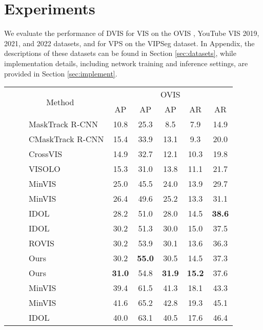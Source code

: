\documentclass[10pt,twocolumn,letterpaper]{article}
\begin{document}
\section{Experiments}
We evaluate the performance of DVIS for VIS on the OVIS \cite{ovis}, YouTube VIS 2019, 2021, and 2022 \cite{masktrackrcnn} datasets, and for VPS on the VIPSeg \cite{clippanofcn} dataset. In Appendix, the descriptions of these datasets can be found in Section \ref{sec:datasets}, while implementation details, including network training and inference settings, are provided in Section \ref{sec:implement}.
\begin{table}[t]
\centering
\setlength{\tabcolsep}{0.5mm}
\begin{tabular}{l|l|l|ccccc}
	\multirow{2}{*}{} & \multicolumn{2}{c|}{\multirow{2}{*}{Method}} & \multicolumn{5}{c}{OVIS} \\
	~ & \multicolumn{2}{c|}{~} & AP &  AP & AP & AR & AR  \\
	\hline
	\multirow{21}{*}{\rotatebox{90}{Online}} & \multirow{12}{*}{\rotatebox{90}{ResNet50}}& MaskTrack R-CNN \cite{masktrackrcnn}  & 10.8 & 25.3 & 8.5 & 7.9 & 14.9 \\
	~ & ~ & CMaskTrack R-CNN \cite{ovis} & 15.4 & 33.9 & 13.1 & 9.3 & 20.0 \\
	~ & ~ & CrossVIS \cite{crossvis}& 14.9 & 32.7 & 12.1 & 10.3 & 19.8 \\
	~ & ~ & VISOLO \cite{visolo}& 15.3 & 31.0 &  13.8 & 11.1 & 21.7 \\
	~ & ~ &  MinVIS \cite{minvis}& 25.0 & 45.5 & 24.0 & 13.9 & 29.7 \\
	~ & ~ & MinVIS \cite{minvis} & 26.4 & 49.6 & 25.2 & 13.3 & 31.1 \\
	~ & ~ & IDOL \cite{idol}& 28.2 & 51.0 & 28.0 & 14.5 & \textbf{38.6} \\
	~ & ~ & IDOL \cite{idol} & 30.2 & 51.3 & 30.0 & 15.0 & 37.5 \\ 
	~ & ~ & ROVIS \cite{rovis}& 30.2 & 53.9 & 30.1 & 13.6 & 36.3 \\
	~ & ~ & Ours & 30.2 & \textbf{55.0} & 30.5 & 14.5 & 37.3 \\
~ & ~ & Ours & \textbf{31.0} & 54.8 & \textbf{31.9} & \textbf{15.2} & 37.6 \\
	\cline{2-8}
	~ & \multirow{11}{*}{\rotatebox{90}{Swin-L}} & MinVIS \cite{minvis} & 39.4 & 61.5 & 41.3 & 18.1 & 43.3 \\
	~ & ~ & MinVIS \cite{minvis} & 41.6 & 65.2 & 42.8 & 19.3 & 45.1 \\
	~ & ~ & IDOL \cite{idol}& 40.0 & 63.1 & 40.5 & 17.6 & 46.4 \\

\end{tabular}
\end{table}
\end{document}
